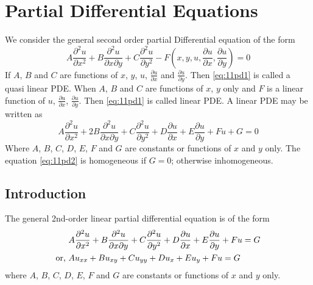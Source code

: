 \documentclass[../main-sheet.tex]{subfiles}
\begin{document}
\chapter{Partial Differential Equations}
We consider the general second order partial Differential equation of the form
\begin{equation}
    A\frac{\partial^2 u}{\partial x^2}+B\frac{\partial^2 u}{\partial x\partial y}+C\frac{\partial^2 u}{\partial y^2}-F(x,y,u,\frac{\partial u}{\partial x},\frac{\partial u}{\partial y})=0 \label{eq:11pd1}
\end{equation}
If \(A\), \(B\) and \(C\) are functions of \(x\), \(y\), \(u\), \(\frac{\partial u}{\partial x}\) and \(\frac{\partial u}{\partial y}\). Then \eqref{eq:11pd1} is called a quasi linear PDE. When \(A\), \(B\) and \(C\) are functions of \(x\), \(y\) only and \(F\) is a linear function of \(u\), \(\frac{\partial u}{\partial x}\), \(\frac{\partial u}{\partial y}\). Then \eqref{eq:11pd1} is called linear PDE. A linear PDE may be written as 
\begin{equation}
    A\frac{\partial^2 u}{\partial x^2}+2B\frac{\partial^2 u}{\partial x\partial y}+C\frac{\partial^2 u}{\partial y^2}+D\frac{\partial u}{\partial x}+E\frac{\partial u}{\partial y}+Fu+G=0 \label{eq:11pd2}
\end{equation}
Where \(A\), \(B\), \(C\), \(D\), \(E\), \(F\) and \(G\) are constants or functions of \(x\) and \(y\) only. The equation \eqref{eq:11pd2} is homogeneous if \(G=0\); otherwise inhomogeneous.
\section{Introduction}
The general 2nd-order linear partial differential equation is of the form
\begin{align}
    &A\frac{\partial^2 u}{\partial x^2}+B\frac{\partial^2 u}{\partial x\partial y}+C\frac{\partial^2 u}{\partial y^2}+D\frac{\partial u}{\partial x}+E\frac{\partial u}{\partial y}+Fu=G\notag\\
    \text{or, }&Au_{xx}+Bu_{xy}+Cu_{yy}+Du_x+Eu_y+Fu=G\label{eq:11pd1.1}
\end{align}
where \(A\), \(B\), \(C\), \(D\), \(E\), \(F\) and \(G\) are constants or functions of \(x\) and \(y\) only.
\end{document}

